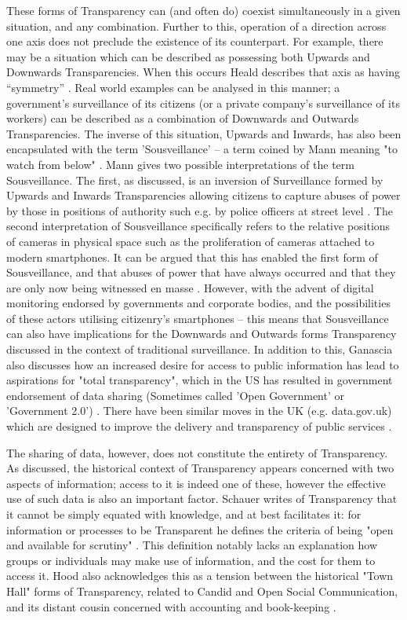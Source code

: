 These forms of Transparency can (and often do) coexist simultaneously in a given situation, and any combination. Further to this, operation of a direction across one axis does not preclude the existence of its counterpart. For example, there may be a situation which can be described as possessing both Upwards and Downwards Transparencies. When this occurs Heald describes that axis as having ``symmetry'' \cite{heald_varieties_2006}. Real world examples can be analysed in this manner; a government's surveillance of its citizens (or a private company's surveillance of its workers) can be described as a combination of Downwards and Outwards Transparencies. The inverse of this situation, Upwards and Inwards, has also been encapsulated with the term 'Sousveillance' -- a term coined by Mann meaning "to watch from below" \cite{mann_sousveillance_2004}. Mann gives two possible interpretations of the term Sousveillance. The first, as discussed, is an inversion of Surveillance formed by Upwards and Inwards Transparencies allowing citizens to capture abuses of power by those in positions of authority such e.g. by police officers at street level \cite{mann_sousveillance_2004}. The second interpretation of Sousveillance specifically refers to the relative positions of cameras in physical space such as the proliferation of cameras attached to modern smartphones. It can be argued that this has enabled the first form of Sousveillance, and that abuses of power that have always occurred and that they are only now being witnessed en masse . However, with the advent of digital monitoring endorsed by governments and corporate bodies, and the possibilities of these actors utilising citizenry's smartphones -- this means that Sousveillance can also have implications for the Downwards and Outwards forms Transparency discussed in the context of traditional surveillance. In addition to this, Ganascia also discusses how an increased desire for access to public information has lead to aspirations for "total transparency", which in the US has resulted in government endorsement of data sharing (Sometimes called 'Open Government' or 'Government 2.0') \cite{ganascia_generalized_2010}. There have been similar moves in the UK (e.g. data.gov.uk) which are designed to improve the delivery and transparency of public services \cite{shadbolt_linked_2012}.

The sharing of data, however, does not constitute the entirety of Transparency. As discussed, the historical context of Transparency appears concerned with two aspects of information; access to it is indeed one of these, however the effective use of such data is also an important factor. Schauer writes of Transparency that it cannot be simply equated with knowledge, and at best facilitates it: for information or processes to be Transparent he defines the criteria of being "open and available for scrutiny" \cite{schauer_transparency_2011}. This definition notably lacks an explanation how groups or individuals may make use of information, and the cost for them to access it. Hood also acknowledges this as a tension between the historical "Town Hall" forms of Transparency, related to Candid and Open Social Communication, and its distant cousin concerned with accounting and book-keeping \cite{hood_transparency_2006}.

